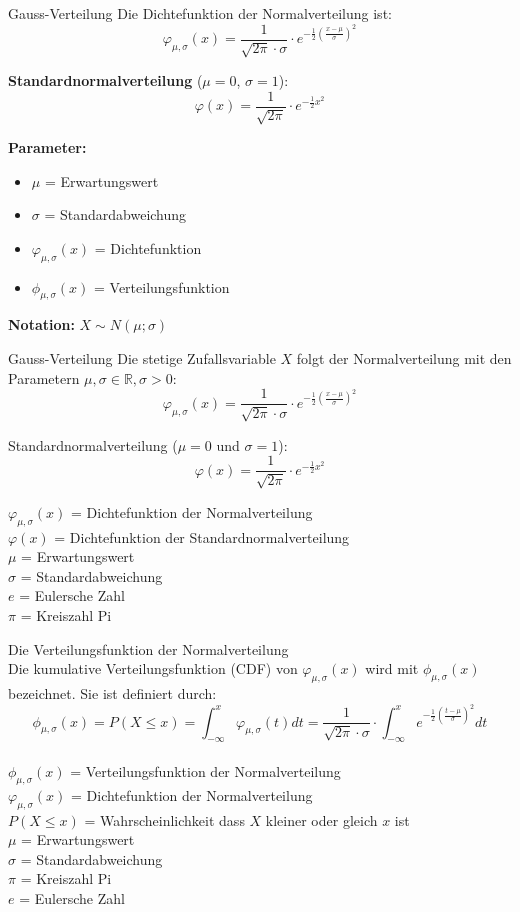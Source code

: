 \begin{definition}{Gauss-Verteilung}
Die Dichtefunktion der Normalverteilung ist:
$$\varphi_{\mu,\sigma}(x)=\frac{1}{\sqrt{2\pi} \cdot \sigma} \cdot e^{-\frac{1}{2}(\frac{x-\mu}{\sigma})^2}$$

\textbf{Standardnormalverteilung} ($\mu=0$, $\sigma=1$):
$$\varphi(x)=\frac{1}{\sqrt{2\pi}} \cdot e^{-\frac{1}{2}x^2}$$

\textbf{Parameter:}
\begin{itemize}
    \item $\mu$ = Erwartungswert
    \item $\sigma$ = Standardabweichung
    \item $\varphi_{\mu,\sigma}(x)$ = Dichtefunktion
    \item $\phi_{\mu,\sigma}(x)$ = Verteilungsfunktion
\end{itemize}

\textbf{Notation:} $X \sim N(\mu;\sigma)$
\end{definition}

\begin{definition}{Gauss-Verteilung}
Die stetige Zufallsvariable $X$ folgt der Normalverteilung mit den Parametern $\mu, \sigma \in \mathbb{R}, \sigma>0$:
$$
\varphi_{\mu,\sigma}(x)=\frac{1}{\sqrt{2\pi} \cdot \sigma} \cdot e^{-\frac{1}{2}(\frac{x-\mu}{\sigma})^2}
$$

Standardnormalverteilung ($\mu=0$ und $\sigma=1$):
$$
\varphi(x)=\frac{1}{\sqrt{2\pi}} \cdot e^{-\frac{1}{2}x^2}
$$

$\varphi_{\mu,\sigma}(x)$ = Dichtefunktion der Normalverteilung\\
$\varphi(x)$ = Dichtefunktion der Standardnormalverteilung\\

$\mu$ = Erwartungswert\\
$\sigma$ = Standardabweichung\\
$e$ = Eulersche Zahl\\
$\pi$ = Kreiszahl Pi\\
\end{definition}
\begin{definition}{Die Verteilungsfunktion der Normalverteilung}\\
Die kumulative Verteilungsfunktion (CDF) von $\varphi_{\mu,\sigma}(x)$ wird mit $\phi_{\mu,\sigma}(x)$ bezeichnet. Sie ist definiert durch:
$$
\phi_{\mu,\sigma}(x) = P(X \leq x) = \int_{-\infty}^x \varphi_{\mu,\sigma}(t)dt = \frac{1}{\sqrt{2\pi} \cdot \sigma} \cdot \int_{-\infty}^x e^{-\frac{1}{2}(\frac{t-\mu}{\sigma})^2} dt
$$
\\
$\phi_{\mu,\sigma}(x)$ = Verteilungsfunktion der Normalverteilung\\
$\varphi_{\mu,\sigma}(x)$ = Dichtefunktion der Normalverteilung\\
$P(X \leq x)$ = Wahrscheinlichkeit dass $X$ kleiner oder gleich $x$ ist\\
$\mu$ = Erwartungswert\\
$\sigma$ = Standardabweichung\\
$\pi$ = Kreiszahl Pi\\
$e$ = Eulersche Zahl\\
\end{definition}

